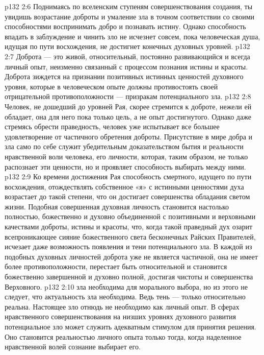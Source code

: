 \vs p132 2:6 \pc Поднимаясь по вселенским ступеням совершенствования создания, ты увидишь возрастание доброты и умаление зла в точном соответствии со своими способностями воспринимать добро и познавать истину. Однако способность впадать в заблуждение и чинить зло не исчезнет совсем, пока человеческая душа, идущая по пути восхождения, не достигнет конечных духовных уровней.
\vs p132 2:7 Доброта --- это живой, относительный, постоянно развивающийся и всегда личный опыт, неизменно связанный с процессом познания истины и красоты. Доброта зиждется на признании позитивных истинных ценностей духовного уровня, которые в человеческом опыте должны противостоять своей отрицательной противоположности --- призракам потенциального зла.
\vs p132 2:8 \pc Человек, не дошедший до уровней Рая, скорее стремится к доброте, нежели ей обладает, она для него пока только цель, а не опыт достигнутого. Однако даже стремясь обрести праведность, человек уже испытывает все большее удовлетворение от частичного обретения доброты. Присутствие в мире добра и зла само по себе служит убедительным доказательством бытия и реальности нравственной воли человека, его личности, которая, таким образом, не только распознает эти ценности, но и проявляет способность выбирать между ними.
\vs p132 2:9 Ко времени достижения Рая способность смертного, идущего по пути восхождения, отождествлять собственное «я» с истинными ценностями духа возрастает до такой степени, что он достигает совершенства обладания светом жизни. Подобная совершенная духовная личность становится настолько полностью, божественно и духовно объединенной с позитивными и верховными качествами доброты, истины и красоты, что, когда такой праведный дух озарит всепроникающее сияние божественного света бесконечных Райских Правителей, исчезает даже возможность появления и тени потенциального зла. В каждой из подобных духовных личностей доброта уже не является частичной, она не имеет более противоположности, перестает быть относительной и становится божественно завершенной и духовно полной, достигая чистоты и совершенства Верховного.
\vs p132 2:10  зла необходима для морального выбора, но из этого не следует, что актуальность зла необходима. Ведь тень --- только относительно реальна. Настоящее зло отнюдь не необходимо как личный опыт. В сферах нравственного совершенствования на низших уровнях духовного развития потенциальное зло может служить адекватным стимулом для принятия решения. Оно становится реальностью личного опыта только тогда, когда наделенное нравственной волей сознание выбирает его.
